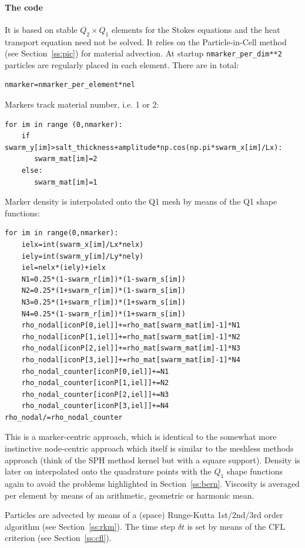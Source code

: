 \paragraph{The code} It is based on stable $Q_2\times Q_1$ elements for the Stokes equations and 
the heat transport equation need not be solved. 
It relies on the Particle-in-Cell method (see Section~\ref{ss:pic}) for material advection. 
At startup {\tt nmarker\_per\_dim**2} particles are regularly placed in each element. 
There are in total:
\begin{lstlisting}
nmarker=nmarker_per_element*nel
\end{lstlisting}

Markers track material number, i.e. 1 or 2:
\begin{lstlisting}
for im in range (0,nmarker):
    if swarm_y[im]>salt_thickness+amplitude*np.cos(np.pi*swarm_x[im]/Lx):
       swarm_mat[im]=2
    else:
       swarm_mat[im]=1
\end{lstlisting}

Marker density is interpolated onto the Q1 mesh by means of the Q1 shape functions:
\begin{lstlisting}
for im in range(0,nmarker):
    ielx=int(swarm_x[im]/Lx*nelx)
    iely=int(swarm_y[im]/Ly*nely)
    iel=nelx*(iely)+ielx
    N1=0.25*(1-swarm_r[im])*(1-swarm_s[im])
    N2=0.25*(1+swarm_r[im])*(1-swarm_s[im])
    N3=0.25*(1+swarm_r[im])*(1+swarm_s[im])
    N4=0.25*(1-swarm_r[im])*(1+swarm_s[im])
    rho_nodal[iconP[0,iel]]+=rho_mat[swarm_mat[im]-1]*N1
    rho_nodal[iconP[1,iel]]+=rho_mat[swarm_mat[im]-1]*N2
    rho_nodal[iconP[2,iel]]+=rho_mat[swarm_mat[im]-1]*N3
    rho_nodal[iconP[3,iel]]+=rho_mat[swarm_mat[im]-1]*N4
    rho_nodal_counter[iconP[0,iel]]+=N1
    rho_nodal_counter[iconP[1,iel]]+=N2
    rho_nodal_counter[iconP[2,iel]]+=N3
    rho_nodal_counter[iconP[3,iel]]+=N4
rho_nodal/=rho_nodal_counter
\end{lstlisting}
This is a marker-centric approach, which is identical to the 
somewhat more instinctive node-centric approach which itself is similar
to the meshless methods approach (think of the SPH method kernel but with a 
square support). Density is later on interpolated onto the quadrature points 
with the $Q_1$ shape functions again to avoid the problems highlighted in 
Section~\ref{ss:bern}.
Viscosity is averaged per element by means of an arithmetic, geometric or harmonic mean.

Particles are advected by means of a (space) Runge-Kutta 1st/2nd/3rd order algorithm (see
Section~\ref{ss:rkm}). The time step $\delta t$ is set by means of the CFL criterion (see
Section~\ref{ss:cfl}).

